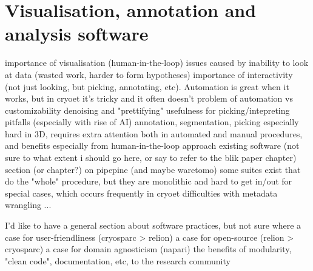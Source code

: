 \chapter{Visualisation, annotation and analysis software}

\begin{outline}
\1 importance of visualisation (human-in-the-loop)
    \2 issues caused by inability to look at data (wasted work, harder to form hypotheses)
    \2 importance of interactivity (not just looking, but picking, annotating, etc). Automation is great when it works, but in cryoet it's tricky and it often doesn't
        \3 problem of automation vs customizability
\1 denoising and "prettifying"
    \2 usefulness for picking/intepreting
    \2 pitfalls (especially with rise of AI)
\1 annotation, segmentation, picking
    \2 especially hard in 3D, requires extra attention both in automated and manual procedures, and benefits especially from human-in-the-loop approach
    \2 existing software (not sure to what extent i should go here, or say to refer to the blik paper chapter)
\1 section (or chapter?) on pipepine (and maybe waretomo)
    \2 some suites exist that do the "whole" procedure, but they are monolithic and hard to get in/out for special cases, which occurs frequently in cryoet
    \2 difficulties with metadata wrangling
    \2 ...

\1 I'd like to have a general section about software practices, but not sure where
    \2 a case for user-friendliness (cryosparc > relion)
    \2 a case for open-source (relion > cryosparc)
    \2 a case for domain agnosticism (napari)
    \2 the benefits of modularity, "clean code", documentation, etc, to the research community

\end{outline}

